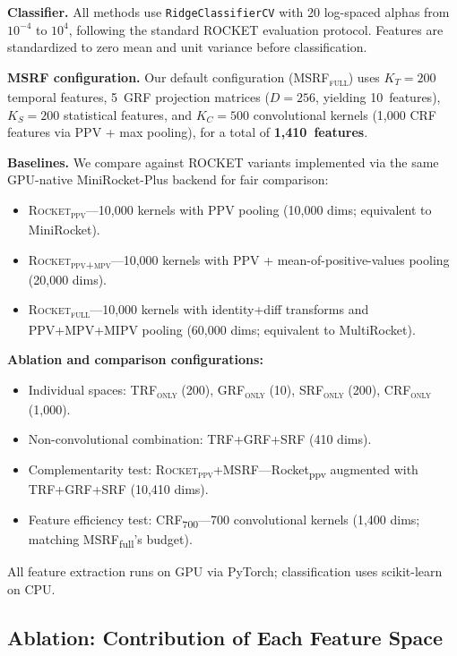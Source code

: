 \documentclass{article}
\begin{document}
\textbf{Classifier.}
All methods use \texttt{RidgeClassifierCV} with 20 log-spaced alphas from $10^{-4}$ to $10^{4}$, following the standard ROCKET evaluation protocol.
Features are standardized to zero mean and unit variance before classification.

\textbf{MSRF configuration.}
Our default configuration (\textsc{MSRF\textsubscript{full}}) uses $K_T = 200$ temporal features, 5~GRF projection matrices ($D{=}256$, yielding 10~features), $K_S = 200$ statistical features, and $K_C = 500$ convolutional kernels (1{,}000 CRF features via PPV + max pooling), for a total of \textbf{1{,}410~features}.

\textbf{Baselines.}
We compare against ROCKET variants implemented via the same GPU-native MiniRocket-Plus backend for fair comparison:
\begin{itemize}
  \item \textsc{Rocket\textsubscript{ppv}}---10{,}000 kernels with PPV pooling (10{,}000 dims; equivalent to MiniRocket).
  \item \textsc{Rocket\textsubscript{ppv+mpv}}---10{,}000 kernels with PPV + mean-of-positive-values pooling (20{,}000 dims).
  \item \textsc{Rocket\textsubscript{full}}---10{,}000 kernels with identity+diff transforms and PPV+MPV+MIPV pooling (60{,}000 dims; equivalent to MultiRocket).
\end{itemize}

\textbf{Ablation and comparison configurations:}
\begin{itemize}
  \item Individual spaces: \textsc{TRF\textsubscript{only}} (200), \textsc{GRF\textsubscript{only}} (10), \textsc{SRF\textsubscript{only}} (200), \textsc{CRF\textsubscript{only}} (1{,}000).
  \item Non-convolutional combination: \textsc{TRF+GRF+SRF} (410 dims).
  \item Complementarity test: \textsc{Rocket\textsubscript{ppv}+MSRF}---Rocket\textsubscript{ppv} augmented with TRF+GRF+SRF (10{,}410 dims).
  \item Feature efficiency test: \textsc{CRF\textsubscript{700}}---700 convolutional kernels (1{,}400 dims; matching MSRF\textsubscript{full}'s budget).
\end{itemize}

All feature extraction runs on GPU via PyTorch; classification uses scikit-learn on CPU.


\subsection{Ablation: Contribution of Each Feature Space}
\end{document}
